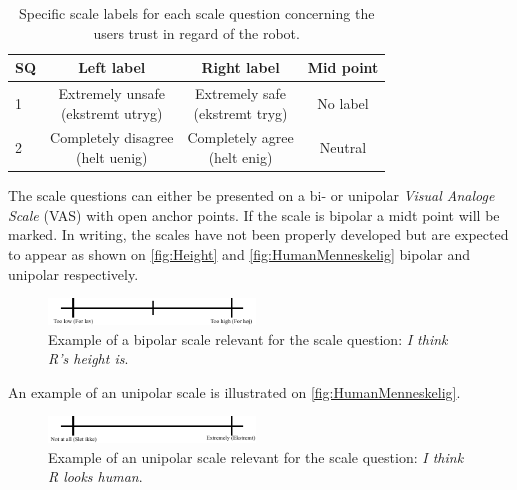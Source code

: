 %
\begin{table}[H]
	\centering
	\begin{tabular}{l|c|c|c}
		SQ  & Left label & Right label & Mid point \\\hline
		1   & \makecell{Extremely unsafe\\ (ekstremt utryg)} & \makecell{Extremely safe \\(ekstremt tryg)} & No label          \\\hline
		2   & \makecell{Completely disagree \\(helt uenig)} & \makecell{Completely agree \\(helt enig)} & Neutral 
	\end{tabular}
	\caption{Specific scale labels for each scale question concerning the users trust in regard of the robot.}
	\label{tab:TrustScale}         
\end{table}
\noindent
%
The scale questions can either be presented on a bi- or unipolar \textit{Visual Analoge Scale} (VAS) with open anchor points. If the scale is bipolar a midt point will be marked. In writing, the scales have not been properly developed but are expected to appear as shown on \autoref{fig:Height} and \autoref{fig:HumanMenneskelig} bipolar and unipolar respectively.
%
\begin{figure}[H]
\centering
\includegraphics[width = 0.49\textwidth]{Figure/HeightHoejde} 
\caption{Example of a bipolar scale relevant for the scale question: \textit{I think R's height is}.}
\label{fig:Height}
\end{figure}
\noindent
% 
An example of an unipolar scale is illustrated on \autoref{fig:HumanMenneskelig}.
%
\begin{figure}[H]
\centering
\includegraphics[width = 0.49\textwidth]{Figure/HumanMenneskelig} 
\caption{Example of an unipolar scale relevant for the scale question: \textit{I think R looks human}.}
\label{fig:HumanMenneskelig}
\end{figure}
\noindent
%
